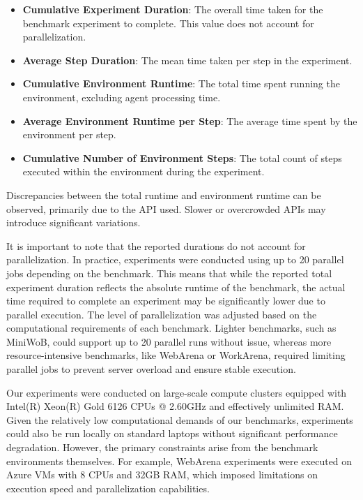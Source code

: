 \documentclass[10pt]{article} %
\begin{document}
\begin{itemize}
    \item \textbf{Cumulative Experiment Duration}: The overall time taken for the benchmark experiment to complete. This value does not account for parallelization.
    \item \textbf{Average Step Duration}: The mean time taken per step in the experiment.
    \item \textbf{Cumulative Environment Runtime}: The total time spent running the environment, excluding agent processing time.
    \item \textbf{Average Environment Runtime per Step}: The average time spent by the environment per step.
    \item \textbf{Cumulative Number of Environment Steps}: The total count of steps executed within the environment during the experiment.
\end{itemize}

Discrepancies between the total runtime and environment runtime can be observed, primarily due to the API used. Slower or overcrowded APIs may introduce significant variations.

It is important to note that the reported durations do not account for parallelization. In practice, experiments were conducted using up to 20 parallel jobs depending on the benchmark. This means that while the reported total experiment duration reflects the absolute runtime of the benchmark, the actual time required to complete an experiment may be significantly lower due to parallel execution. The level of parallelization was adjusted based on the computational requirements of each benchmark. Lighter benchmarks, such as MiniWoB, could support up to 20 parallel runs without issue, whereas more resource-intensive benchmarks, like WebArena or WorkArena, required limiting parallel jobs to prevent server overload and ensure stable execution.

Our experiments were conducted on large-scale compute clusters equipped with Intel(R) Xeon(R) Gold 6126 CPUs @ 2.60GHz and effectively unlimited RAM. Given the relatively low computational demands of our benchmarks, experiments could also be run locally on standard laptops without significant performance degradation. However, the primary constraints arise from the benchmark environments themselves. For example, WebArena experiments were executed on Azure VMs with 8 CPUs and 32GB RAM, which imposed limitations on execution speed and parallelization capabilities.
\end{document}

